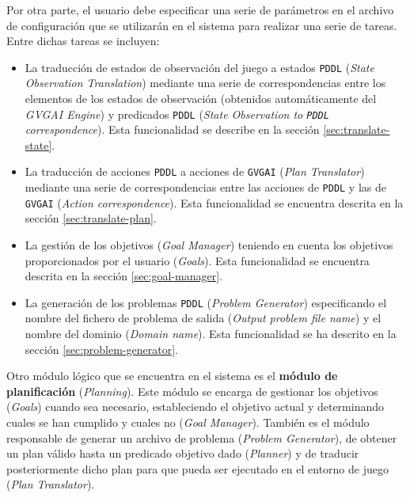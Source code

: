 Por otra parte, el usuario debe especificar una serie de parámetros en el archivo de
configuración que se utilizarán en el sistema para realizar una serie de tareas.
Entre dichas tareas se incluyen:

\begin{itemize}[label=\textbullet]
    \item La traducción de estados de observación del juego a estados \texttt{PDDL}
    (\textit{State Observation Translation}) mediante una serie de correspondencias entre
    los elementos de los estados de observación (obtenidos automáticamente del \textit{GVGAI Engine})
    y predicados \texttt{PDDL} (\textit{State Observation to \texttt{PDDL} correspondence}).
    Esta funcionalidad se describe en la sección \ref{sec:translate-state}.
    \item La traducción de acciones \texttt{PDDL} a acciones de \texttt{GVGAI}
    (\textit{Plan Translator}) mediante una serie de correspondencias entre las acciones de
    \texttt{PDDL} y las de \texttt{GVGAI} (\textit{Action correspondence}).
    Esta funcionalidad se encuentra descrita en la sección \ref{sec:translate-plan}.
    \item La gestión de los objetivos (\textit{Goal Manager}) teniendo en cuenta los
    objetivos proporcionados por el usuario (\textit{Goals}). Esta funcionalidad se
    encuentra descrita en la sección \ref{sec:goal-manager}.
    \item La generación de los problemas \texttt{PDDL} (\textit{Problem Generator})
    especificando el nombre del fichero de problema de salida (\textit{Output problem file name})
    y el nombre del dominio (\textit{Domain name}). Esta funcionalidad se ha descrito
    en la sección \ref{sec:problem-generator}.
\end{itemize}


Otro módulo lógico que se encuentra en el sistema es el \textbf{módulo de planificación}
(\textit{Planning}). Este módulo se encarga de gestionar los objetivos (\textit{Goals}) cuando
sea necesario, estableciendo el objetivo actual y determinando cuales se han cumplido y cuales no
(\textit{Goal Manager}). También es el módulo responsable de generar un archivo de problema
(\textit{Problem Generator}), de obtener un plan válido hasta un predicado objetivo dado
(\textit{Planner}) y de traducir posteriormente dicho plan para que pueda ser ejecutado
en el entorno de juego (\textit{Plan Translator}).

